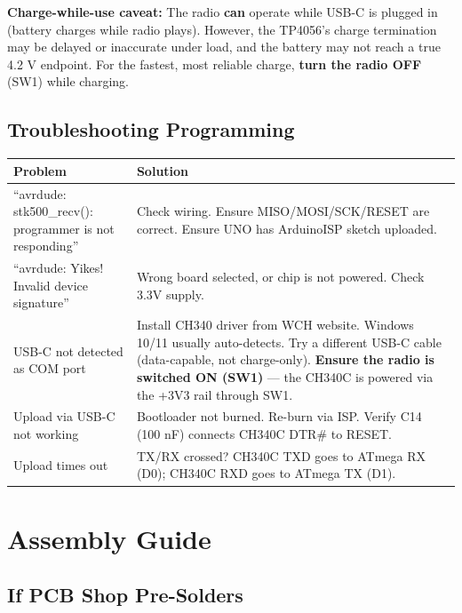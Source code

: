 \documentclass[a4paper,11pt]{article}
\renewcommand*{\,}{ }%
\begin{document}
\begin{warningbox}
\textbf{Charge-while-use caveat:} The radio \textbf{can} operate while USB-C is plugged in (battery charges while radio plays). However, the TP4056's charge termination may be delayed or inaccurate under load, and the battery may not reach a true 4.2\,V endpoint. For the fastest, most reliable charge, \textbf{turn the radio OFF} (SW1) while charging.
\end{warningbox}

\subsection{Troubleshooting Programming}

\begin{longtable}{@{}p{5cm}p{8cm}@{}}
\toprule
\textbf{Problem} & \textbf{Solution} \\
\midrule
\endhead
``avrdude: stk500\_recv(): programmer is not responding'' & Check wiring. Ensure MISO/MOSI/SCK/RESET are correct. Ensure UNO has ArduinoISP sketch uploaded. \\
``avrdude: Yikes! Invalid device signature'' & Wrong board selected, or chip is not powered. Check 3.3V supply. \\
USB-C not detected as COM port & Install CH340 driver from WCH website. Windows 10/11 usually auto-detects. Try a different USB-C cable (data-capable, not charge-only). \textbf{Ensure the radio is switched ON (SW1)} --- the CH340C is powered via the +3V3 rail through SW1. \\
Upload via USB-C not working & Bootloader not burned. Re-burn via ISP. Verify C14 (100\,nF) connects CH340C DTR\# to RESET. \\
Upload times out & TX/RX crossed? CH340C TXD goes to ATmega RX (D0); CH340C RXD goes to ATmega TX (D1). \\
\bottomrule
\end{longtable}

\section{Assembly Guide}
\label{sec:assembly}

\subsection{If PCB Shop Pre-Solders}
\end{document}
